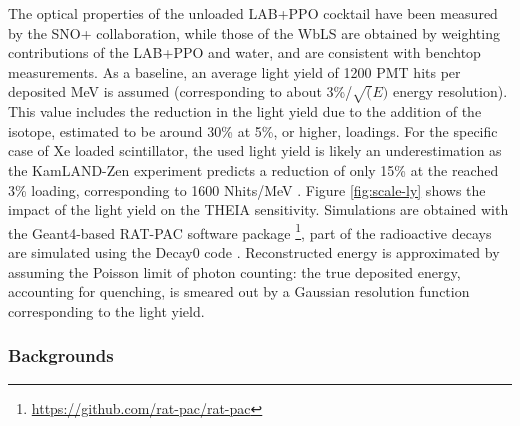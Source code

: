The optical properties of the unloaded LAB+PPO cocktail have been measured by the SNO+ collaboration, while those of the WbLS are obtained by weighting contributions of the LAB+PPO and water, and are consistent with benchtop measurements. As a baseline, an average light yield of 1200 PMT hits per deposited MeV is assumed (corresponding to about 3\%/$\sqrt(E)$ energy resolution). This value includes the reduction in the light yield due to the addition of the isotope, estimated to be around 30\% at 5\%, or higher, loadings. For the specific case of Xe loaded scintillator, the used light yield is likely an underestimation as the KamLAND-Zen experiment predicts a reduction of only 15\% at the reached 3\% loading, corresponding to 1600 Nhits/MeV \cite{KZ-2011}. Figure \ref{fig:scale-ly} shows the impact of the light yield on the THEIA sensitivity.
Simulations are obtained with the Geant4-based RAT-PAC software package \footnote{\url{https://github.com/rat-pac/rat-pac}}, part of the radioactive decays are simulated using the Decay0 code \cite{decay0}. Reconstructed energy is approximated by assuming the Poisson limit of
photon counting: the true deposited energy, accounting for quenching, is smeared out by a Gaussian resolution function corresponding to the light
yield.

\subsubsection{Backgrounds}


